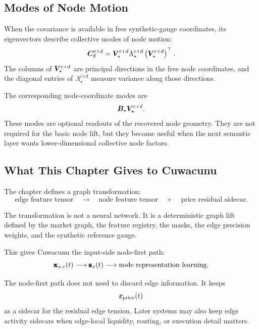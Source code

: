 \subsection{Modes of Node Motion}
\label{subsec:modes-of-node-motion}

When the covariance is available in free synthetic-gauge coordinates, its
eigenvectors describe collective modes of node motion:
\[
  \bm{C}_{\theta}^{c\,i\,d}
  =
  \bm{V}_{\star}^{c\,i\,d}
  \Lambda_{\star}^{c\,i\,d}
  \left(
    \bm{V}_{\star}^{c\,i\,d}
  \right)^{\top}.
\]
The columns of $\bm{V}_{\star}^{c\,i\,d}$ are principal directions in the free
node coordinates, and the diagonal entries of $\Lambda_{\star}^{c\,i\,d}$
measure variance along those directions.

The corresponding node-coordinate modes are
\[
  \bm{B}_{\star}
  \bm{V}_{\star}^{c\,i\,d}.
\]
These modes are optional readouts of the recovered node geometry.  They are not
required for the basic node lift, but they become useful when the next semantic
layer wants lower-dimensional collective node factors.

\subsection{What This Chapter Gives to Cuwacunu}
\label{subsec:what-nodelift-gives-cuwacunu}

The chapter defines a graph transformation:
\[
  \text{edge feature tensor}
  \quad
  \longrightarrow
  \quad
  \text{node feature tensor}
  \quad
  +
  \quad
  \text{price residual sidecar}.
\]

The transformation is not a neural network.  It is a deterministic graph lift
defined by the market graph, the feature registry, the masks, the edge precision
weights, and the synthetic reference gauge.

This gives Cuwacunu the input-side node-first path:
\[
  \pmb{\mathbf{x}}_{u\,v}(t)
  \longrightarrow
  \pmb{\mathbf{s}}_{x}(t)
  \longrightarrow
  \text{node representation learning}.
\]


The node-first path does not need to discard edge information.  It keeps
\[
  \pmb{\mathbf{\varepsilon}}_{\mathrm{price}}(t)
\]
as a sidecar for the residual edge tension.  Later systems may also keep edge
activity sidecars when edge-local liquidity, routing, or execution detail
matters.

